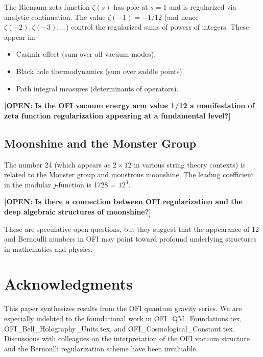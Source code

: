 \documentclass[12pt]{article}
\theoremstyle{definition}
\newcommand{\OPEN}[1]{\textcolor{opencolor}{\textbf{[OPEN: #1]}}}
\begin{document}
The Riemann zeta function $\zeta(s)$ has pole at $s=1$ and is regularized via
analytic continuation. The value $\zeta(-1) = -1/12$ (and hence $\zeta(-2), \zeta(-3), \ldots$)
control the regularized sums of powers of integers. These appear in:
\begin{itemize}
  \item Casimir effect (sum over all vacuum modes).
  \item Black hole thermodynamics (sum over saddle points).
  \item Path integral measures (determinants of operators).
\end{itemize}

\OPEN{Is the OFI vacuum energy arm value 1/12 a manifestation of zeta function
regularization appearing at a fundamental level?}

\subsection{Moonshine and the Monster Group}

The number 24 (which appears as $2 \times 12$ in various string theory contexts)
is related to the Monster group and monstrous moonshine. The leading coefficient
in the modular $j$-function is 1728 = $12^3$.

\OPEN{Is there a connection between OFI regularization and the deep algebraic
structures of moonshine?}

These are speculative open questions, but they suggest that the appearance of 12
and Bernoulli numbers in OFI may point toward profound underlying structures in
mathematics and physics.

\section*{Acknowledgments}

This paper synthesizes results from the OFI quantum gravity series. We are especially
indebted to the foundational work in OFI_QM_Foundations.tex, OFI_Bell_Holography_Units.tex,
and OFI_Cosmological_Constant.tex. Discussions with colleagues on the interpretation
of the OFI vacuum structure and the Bernoulli regularization scheme have been invaluable.
\end{document}
